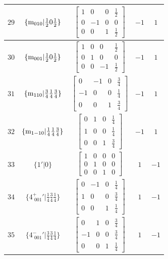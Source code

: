 \documentclass[fleqn,8pt]{jsarticle}
\begin{document}
\begin{longtable}{ccccc}
$ 29 $ & $ \{{\rm m}_{010}|\frac{1}{2} 0 \frac{1}{2}\} $ & $ \begin{bmatrix} 1 & 0 & 0 & \frac{1}{2} \\ 0 & -1 & 0 & 0 \\ 0 & 0 & 1 & \frac{1}{2} \end{bmatrix} $ & $ -1 $ & $ 1 $ \\ \hline
$ 30 $ & $ \{{\rm m}_{001}|\frac{1}{2} 0 \frac{1}{2}\} $ & $ \begin{bmatrix} 1 & 0 & 0 & \frac{1}{2} \\ 0 & 1 & 0 & 0 \\ 0 & 0 & -1 & \frac{1}{2} \end{bmatrix} $ & $ -1 $ & $ 1 $ \\ \hline
$ 31 $ & $ \{{\rm m}_{110}|\frac{3}{4} \frac{1}{4} \frac{3}{4}\} $ & $ \begin{bmatrix} 0 & -1 & 0 & \frac{3}{4} \\ -1 & 0 & 0 & \frac{1}{4} \\ 0 & 0 & 1 & \frac{3}{4} \end{bmatrix} $ & $ -1 $ & $ 1 $ \\ \hline
$ 32 $ & $ \{{\rm m}_{1-10}|\frac{1}{4} \frac{1}{4} \frac{3}{4}\} $ & $ \begin{bmatrix} 0 & 1 & 0 & \frac{1}{4} \\ 1 & 0 & 0 & \frac{1}{4} \\ 0 & 0 & 1 & \frac{3}{4} \end{bmatrix} $ & $ -1 $ & $ 1 $ \\ \hline
$ 33 $ & $ \{1{}'|0\} $ & $ \begin{bmatrix} 1 & 0 & 0 & 0 \\ 0 & 1 & 0 & 0 \\ 0 & 0 & 1 & 0 \end{bmatrix} $ & $ 1 $ & $ -1 $ \\ \hline
$ 34 $ & $ \{4^{+}_{\,\,001}{}'|\frac{1}{4} \frac{3}{4} \frac{1}{4}\} $ & $ \begin{bmatrix} 0 & -1 & 0 & \frac{1}{4} \\ 1 & 0 & 0 & \frac{3}{4} \\ 0 & 0 & 1 & \frac{1}{4} \end{bmatrix} $ & $ 1 $ & $ -1 $ \\ \hline
$ 35 $ & $ \{4^{-}_{\,\,001}{}'|\frac{3}{4} \frac{3}{4} \frac{1}{4}\} $ & $ \begin{bmatrix} 0 & 1 & 0 & \frac{3}{4} \\ -1 & 0 & 0 & \frac{3}{4} \\ 0 & 0 & 1 & \frac{1}{4} \end{bmatrix} $ & $ 1 $ & $ -1 $ \\ \hline

\end{longtable}
\end{document}

